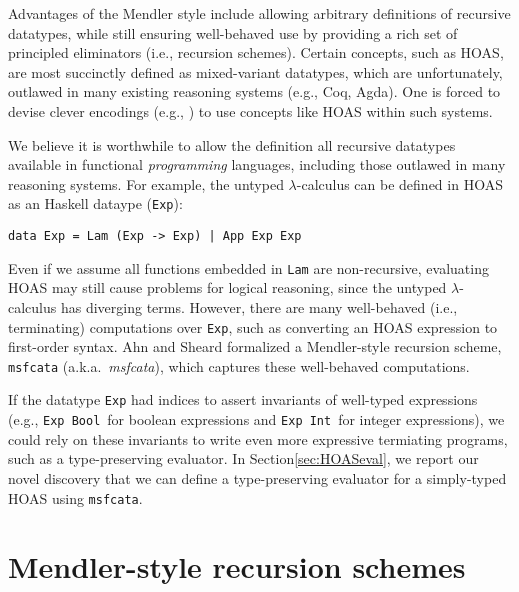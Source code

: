 \documentclass[a4paper,UKenglish]{lipics}
\newcommand{\eg}[0]{{e.g.}}
\newcommand{\ie}[0]{{i.e.}}
\newcommand{\aka}[0]{{a.k.a.}}
\begin{document}
Advantages of the Mendler style include allowing arbitrary definitions of
recursive datatypes, while still ensuring well-behaved use by providing
a rich set of principled eliminators (\ie, recursion schemes).
Certain concepts, such as HOAS, are most succinctly defined as
mixed-variant datatypes, which are unfortunately, outlawed in many existing
reasoning systems (\eg, Coq, Agda). One is forced to devise clever encodings
(\eg, \cite{PHOAS}) to use concepts like HOAS within such systems.

We believe it is worthwhile to allow the definition all recursive datatypes
available in functional \emph{programming} languages, including those outlawed
in many reasoning systems. For example, the untyped $\lambda$-calculus can be
defined in HOAS as an Haskell dataype (\lstinline{Exp}):
\begin{lstlisting}
data Exp = Lam (Exp -> Exp) | App Exp Exp
\end{lstlisting}
Even if we assume all functions embedded in \lstinline{Lam} are non-recursive,
evaluating HOAS may still cause problems for logical reasoning, since
the untyped $\lambda$-calculus has diverging terms. However, there are many
well-behaved (\ie, terminating) computations over \lstinline{Exp}, such as
converting an HOAS expression to first-order syntax.
Ahn and Sheard \cite{AhnShe11} formalized a Mendler-style recursion scheme,
\lstinline{msfcata}  (\aka\ \textit{msfcata}), which captures these
well-behaved computations.

If the datatype \lstinline{Exp} had indices to assert invariants of
well-typed expressions (\eg, \lstinline{Exp Bool}\, for boolean expressions
and \lstinline{Exp Int}\, for integer expressions), we could rely on these
invariants to write even more expressive termiating programs, such as
a type-preserving evaluator. In Section\;\ref{sec:HOASeval}, we report
our novel discovery that we can define a type-preserving evaluator for
a simply-typed HOAS using \lstinline{msfcata}.


\section{Mendler-style recursion schemes}
\end{document}
